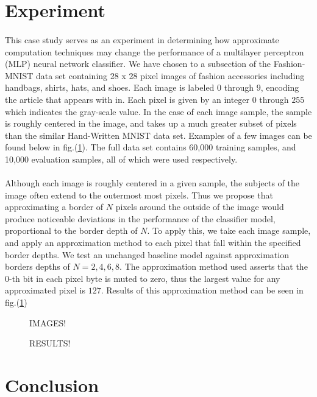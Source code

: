\documentclass[12pt,letterpaper]{article}
\begin{document}

\section*{Experiment}

\paragraph*{}This case study serves as an experiment in determining how approximate computation techniques may change the performance of a multilayer perceptron (MLP) neural network classifier. We have chosen to a subsection of the Fashion-MNIST data set containing 28 x 28 pixel images of fashion accessories including handbags, shirts, hats, and shoes. Each image is labeled $0$ through $9$, encoding the article that appears with in. Each pixel is given by an integer $0$ through $255$ which indicates the gray-scale value. In the case of each image sample, the sample is roughly centered in the image, and takes up a much greater subset of pixels than the similar Hand-Written MNIST data set. Examples of a few images can be found below in fig.(\ref{images}). The full data set contains 60,000 training samples, and 10,000 evaluation samples, all of which were used respectively.

\paragraph*{}Although each image is roughly centered in a given sample, the subjects of the image often extend to the outermost most pixels. Thus we propose that approximating a border of $N$ pixels around the outside of the image would produce noticeable deviations in the performance of the classifier model, proportional to the border depth of $N$. To apply this, we take each image sample, and apply an approximation method to each pixel that fall within the specified border depths. We test an unchanged baseline model against approximation borders depths of $N = 2,4,6,8$. The approximation method used asserts that the $0$-th bit in each pixel byte is muted to zero, thus the largest value for any approximated pixel is $127$. Results of this approximation method can be seen in fig.(\ref{images})


\begin{figure}[h]
\label{images}
IMAGES!
\end{figure}





\begin{figure}[H]
\label{results}
RESULTS!
\end{figure}

\section*{Conclusion}




\end{document}
